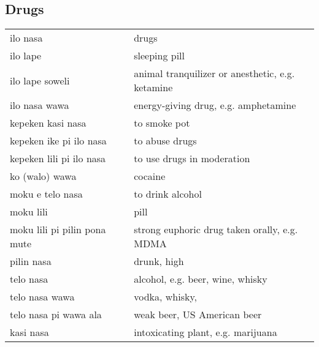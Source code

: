 \subsection{Drugs}
%
\begin{supertabular}{p{4,5cm}|ll}
    ilo nasa                                         &  & drugs                                                 \\
    ilo lape                                         &  & sleeping pill                                         \\
    ilo lape soweli                                  &  & animal tranquilizer or anesthetic, e.g. ketamine      \\
    ilo nasa wawa                                    &  & energy-giving drug, e.g. amphetamine                  \\
    kepeken kasi nasa                                &  & to smoke pot                                          \\
    kepeken ike pi ilo nasa                          &  & to abuse drugs                                        \\
    kepeken lili pi ilo nasa                         &  & to use drugs in moderation                            \\
    ko (walo) wawa                                   &  & cocaine                                               \\
    moku e telo nasa                                 &  & to drink alcohol                                      \\
    moku lili                                        &  & pill                                                  \\
    moku lili pi pilin pona mute                     &  & strong euphoric drug taken orally, e.g. MDMA          \\
    pilin nasa                                       &  & drunk, high                                           \\
    telo nasa                                        &  & alcohol, e.g. beer, wine, whisky                      \\
    telo nasa wawa                                   &  & vodka, whisky,                                        \\
    telo nasa pi wawa ala                            &  & weak beer, US American beer                           \\
    kasi nasa                                        &  & intoxicating plant, e.g. marijuana                    \\

\end{supertabular}
